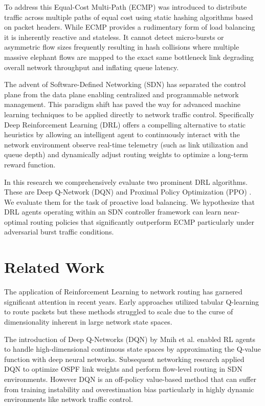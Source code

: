 \documentclass[10pt,twocolumn,letterpaper]{article}
\begin{document}
To address this Equal-Cost Multi-Path (ECMP) was introduced to distribute traffic across multiple paths of equal cost using static hashing algorithms based on packet headers. While ECMP provides a rudimentary form of load balancing it is inherently reactive and stateless. It cannot detect micro-bursts or asymmetric flow sizes frequently resulting in hash collisions where multiple massive elephant flows are mapped to the exact same bottleneck link degrading overall network throughput and inflating queue latency.

The advent of Software-Defined Networking (SDN) has separated the control plane from the data plane enabling centralized and programmable network management. This paradigm shift has paved the way for advanced machine learning techniques to be applied directly to network traffic control. Specifically Deep Reinforcement Learning (DRL) offers a compelling alternative to static heuristics by allowing an intelligent agent to continuously interact with the network environment observe real-time telemetry (such as link utilization and queue depth) and dynamically adjust routing weights to optimize a long-term reward function.

In this research we comprehensively evaluate two prominent DRL algorithms. These are Deep Q-Network (DQN) \cite{mnih2015human} and Proximal Policy Optimization (PPO) \cite{schulman2017proximal}. We evaluate them for the task of proactive load balancing. We hypothesize that DRL agents operating within an SDN controller framework can learn near-optimal routing policies that significantly outperform ECMP particularly under adversarial burst traffic conditions.

\section{Related Work}
The application of Reinforcement Learning to network routing has garnered significant attention in recent years. Early approaches utilized tabular Q-learning to route packets but these methods struggled to scale due to the curse of dimensionality inherent in large network state spaces.

The introduction of Deep Q-Networks (DQN) by Mnih et al. \cite{mnih2015human} enabled RL agents to handle high-dimensional continuous state spaces by approximating the Q-value function with deep neural networks. Subsequent networking research applied DQN to optimize OSPF link weights and perform flow-level routing in SDN environments. However DQN is an off-policy value-based method that can suffer from training instability and overestimation bias particularly in highly dynamic environments like network traffic control.
\end{document}
